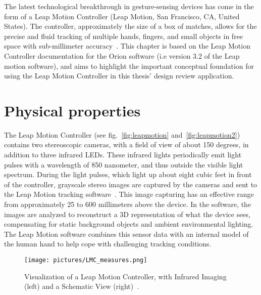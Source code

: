 

The latest technological breakthrough in gesture-sensing devices has come in the form of a Leap Motion Controller (Leap Motion, San Francisco, CA, United States). 
The controller, approximately the size of a box of matches, allows for the precise and fluid tracking of multiple hands, fingers, and small objects in free space with 
sub-millimeter accuracy~\citep{Guna2014}. This chapter is based on the Leap Motion Controller documentation for the Orion software (i.e version 3.2 of the Leap motion software), 
and aims to highlight the important conceptual foundation for using the Leap Motion Controller in this thesis' design review application.

\section{Physical properties}
The Leap Motion Controller (see fig.~\vref{fig:leapmotion} and~\vref{fig:leapmotion2}) contains two stereoscopic cameras, with a field of view of about 150 degrees, 
in addition to three infrared LEDs. These infrared lights periodically emit light pulses with a wavelength of 850 nanometer, and thus outside the visible light spectrum. 
During the light pulses, 
which light up about eight cubic feet in front of the controller, grayscale stereo images are captured by the cameras and sent to the 
Leap Motion tracking software~\citep{LeapMotion2016}. 
This image capturing has an effective range from approximately 25 to 600 millimeters above the device.
In the software, the images are analyzed to reconstruct a 3D representation of what the device sees, 
compensating for static background objects and ambient environmental lighting. 
The Leap Motion software combines this sensor data with an internal model of the human hand to help cope with challenging tracking conditions.


\begin{figure}%
	\texttt{[image: pictures/LMC\_measures.png]}
	\caption[Visualization of a Leap Motion Controller]{Visualization of a Leap Motion Controller, with Infrared Imaging (left) and a Schematic View (right)~\citep{Weichert2013}.}
	\label{fig:leapmotion2}
\end{figure} 

